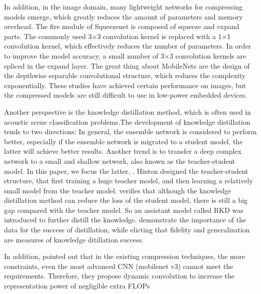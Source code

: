 \documentclass[conference]{IEEEtran}
\begin{document}
	In addition, in the image domain, many lightweight networks for compressing
	models emerge, which greatly reduces the amount of parameters and memory
	overhead. The fire module of Squeezenet\cite{iandola2016squeezenet} is composed
	of squeeze and expand parts. The commonly used 3×3 convolution kernel is
	replaced with a 1×1 convolution kernel, which effectively reduces the number of
	parameters. In order to improve the model accuracy, a small number of 3×3
	convolution kernels are spliced in the expand layer. The great thing about
	MobileNets\cite{howard2017mobilenets}\cite{sandler2019mobilenetv2}\cite{howard2019searching}
	are the design of the depthwise separable convolutional structure, which reduces
	the complexity exponentially. These studies have achieved certain performance on
	images, but the compressed models are still difficult to use in low-power
	embedded devices.
	
	Another perspective is the knowledge distillation method, which is often used in
	acoustic scene classification problems\cite{9186616}.The development of
	knowledge distillation tends to two directions: In general, the ensemble network
	is considered to perform better, especially if the ensemble network is migrated
	to a student model, the latter will achieve better
	results\cite{DBLP:journals/corr/abs-2012-09816}. Another trend is to transfer a
	deep complex network to a small and shallow network, also known as the
	teacher-student model. In this paper, we focus the latter,    .
	Hinton\cite{hinton2015distilling} designed the teacher-student structure, that
	first training a huge teacher model, and then learning a relatively small model
	from the teacher model. \cite{GAO2021154} verifies that although the knowledge
	distillation method can reduce the loss of the student model, there is still a
	big gap compared with the teacher model. So an assistant model called RKD was
	introduced to further distill the knowledge.\cite{stanton2021does} demonstrate the importance of the data for the success of distillation, while elicting that fidelity and generalization are measures of knowledge ditillation success.
	
	In addition, \cite{9157588} pointed out that in the existing compression techniques, the more constraints, even the most advanced CNN (mobilenet v3) cannot meet the requirements. Therefore, they propose dynamic convolution to increase the representation power of negligible extra FLOPs
\end{document}
